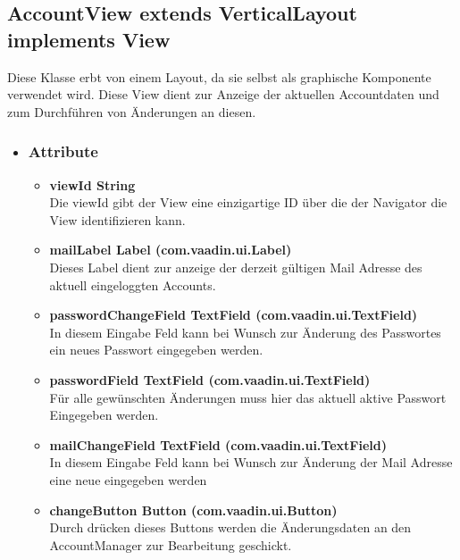 \newpage
\subsection{AccountView extends VerticalLayout implements View}
Diese Klasse erbt von einem Layout, da sie selbst als graphische Komponente verwendet wird. Diese View dient zur Anzeige der aktuellen Accountdaten und zum Durchführen von Änderungen an diesen.

\begin{itemize}
\item \subsubsection{Attribute}
\begin{itemize}
\item \textbf{viewId String} \hfill\\ 
Die viewId gibt der View eine einzigartige ID über die der Navigator die View identifizieren kann.

\item \textbf{mailLabel Label (com.vaadin.ui.Label)} \hfill\\ 
Dieses Label dient zur anzeige der derzeit gültigen Mail Adresse des aktuell eingeloggten Accounts.

\item \textbf{passwordChangeField TextField (com.vaadin.ui.TextField)} \hfill\\ 
In diesem Eingabe Feld kann bei Wunsch zur Änderung des Passwortes ein neues Passwort eingegeben werden.

\item \textbf{passwordField TextField (com.vaadin.ui.TextField)} \hfill\\ 
Für alle gewünschten Änderungen muss hier das aktuell aktive Passwort Eingegeben werden.

\item \textbf{mailChangeField TextField (com.vaadin.ui.TextField)} \hfill\\ 
In diesem Eingabe Feld kann bei Wunsch zur Änderung der Mail Adresse eine neue eingegeben werden

\item \textbf{changeButton Button (com.vaadin.ui.Button)} \hfill\\
Durch drücken dieses Buttons werden die Änderungsdaten an den AccountManager zur Bearbeitung geschickt.

\end{itemize}


\end{itemize}
